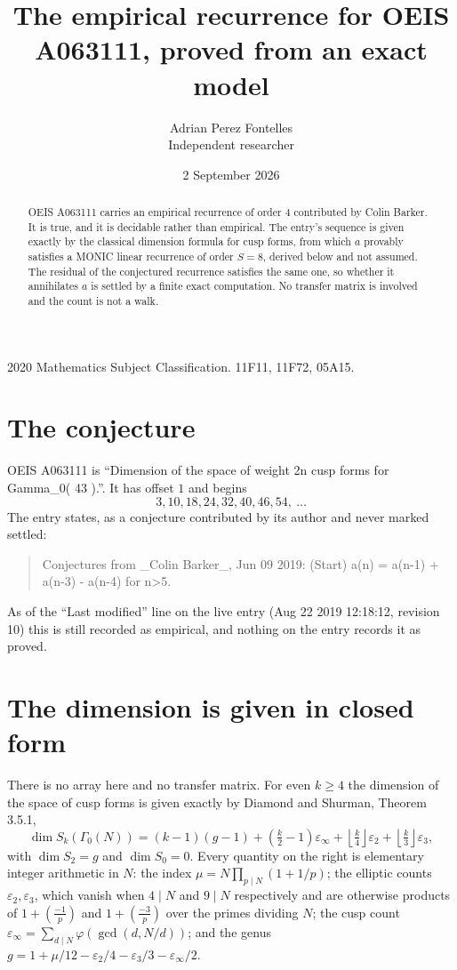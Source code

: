\documentclass[11pt,a4paper]{article}
\title{The empirical recurrence for OEIS A063111, proved from an exact model}
\author{Adrian Perez Fontelles\\ \small Independent researcher}
\date{2 September 2026}
\theoremstyle{plain}
\theoremstyle{definition}
\begin{document}
\maketitle

\begin{abstract}
OEIS A063111 carries an empirical recurrence of order $4$ contributed by Colin Barker. It is true, and it is
decidable rather than empirical. The entry's sequence is given exactly by the classical dimension formula for cusp forms, from
which $a$ provably satisfies a MONIC linear recurrence of order $S=8$, derived below and not
assumed. The residual of the conjectured recurrence satisfies the same one, so whether it
annihilates $a$ is settled by a finite exact computation. No transfer matrix is involved and
the count is not a walk.
\end{abstract}

\noindent\small 2020 Mathematics Subject Classification. 11F11, 11F72, 05A15.\normalsize

\section{The conjecture}

OEIS A063111 is ``Dimension of the space of weight 2n cusp forms for Gamma\_0( 43 ).''. It has offset $1$ and begins
\[
3, 10, 18, 24, 32, 40, 46, 54,\ \dots
\]
The entry states, as a conjecture contributed by its author and never marked settled:
\begin{quote}
Conjectures from \_Colin Barker\_, Jun 09 2019: (Start) a(n) = a(n-1) + a(n-3) - a(n-4) for n>5.
\end{quote}
As of the ``Last modified'' line on the live entry (Aug 22 2019 12:18:12, revision 10)
this is still recorded as empirical, and nothing on the entry records it as proved.

\section{The dimension is given in closed form}

There is no array here and no transfer matrix. For even $k\ge4$ the dimension of the space of
cusp forms is given exactly by Diamond and Shurman, Theorem 3.5.1,
\[
\dim S_k(\Gamma_0(N))=(k-1)(g-1)+\left(\tfrac{k}{2}-1\right)\varepsilon_\infty
+\left\lfloor\tfrac{k}{4}\right\rfloor\varepsilon_2
+\left\lfloor\tfrac{k}{3}\right\rfloor\varepsilon_3 ,
\]
with $\dim S_2=g$ and $\dim S_0=0$. Every quantity on the right is elementary integer
arithmetic in $N$: the index $\mu=N\prod_{p\mid N}(1+1/p)$; the elliptic counts
$\varepsilon_2,\varepsilon_3$, which vanish when $4\mid N$ and $9\mid N$ respectively and are
otherwise products of $1+\left(\frac{-1}{p}\right)$ and $1+\left(\frac{-3}{p}\right)$
over the primes dividing $N$; the cusp count
$\varepsilon_\infty=\sum_{d\mid N}\varphi(\gcd(d,N/d))$; and the genus
$g=1+\mu/12-\varepsilon_2/4-\varepsilon_3/3-\varepsilon_\infty/2$.
\end{document}
